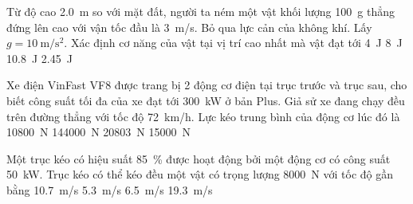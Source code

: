 \begin{ex}
	Từ độ cao \SI{2.0}{\meter} so với mặt đất, người ta ném một vật khối lượng \SI{100}{\gram} thẳng đứng lên cao với vận tốc đầu là \SI{3}{\meter/\second}. Bỏ qua lực cản của không khí. Lấy $g=\SI{10}{\meter/\second^2}$. Xác định cơ năng của vật tại vị trí cao nhất mà vật đạt tới
	\choice
	{\SI{4}{\joule}}
	{\SI{8}{\joule}}
	{\SI{10.8}{\joule}}
	{\True \SI{2.45}{\joule}}
	\loigiai{}
\end{ex}
\begin{ex}
	Xe điện VinFast VF8 được trang bị 2 động cơ điện tại trục trước và trục sau, cho biết công suất tối đa của xe đạt tới \SI{300}{\kilo\watt} ở bản Plus. Giả sử xe đang chạy đều trên đường thẳng với tốc độ \SI{72}{\kilo\meter/\hour}. Lực kéo trung bình của động cơ lúc đó là
	\choice
	{\SI{10800}{\newton}}
	{\SI{144000}{\newton}}
	{\SI{20803}{\newton}}
	{\True \SI{15000}{\newton}}
	\loigiai{}
\end{ex}

\begin{ex}
	Một trục kéo có hiệu suất \SI{85}{\percent} được hoạt động bởi một động cơ có công suất \SI{50}{\kilo\watt}. Trục kéo có thể kéo đều một vật có trọng lượng \SI{8000}{\newton} với tốc độ gần bằng
	\choice
	{\SI{10.7}{\meter/\second}}
	{\True \SI{5.3}{\meter/\second}}
	{\SI{6.5}{\meter/\second}}
	{\SI{19.3}{\meter/\second}}
	\loigiai{}
\end{ex}

